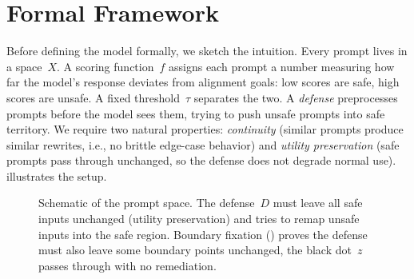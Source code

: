 \documentclass[11pt]{article}
\begin{document}
\section{Formal Framework}
\label{sec:setup}

Before defining the model formally, we sketch the intuition. Every
prompt lives in a space~$X$. A scoring function~$f$ assigns each prompt
a number measuring how far the model's response deviates from alignment
goals: low scores are safe, high scores are unsafe. A fixed
threshold~$\tau$ separates the two. A \emph{defense} preprocesses
prompts before the model sees them, trying to push unsafe prompts into
safe territory. We require two natural properties: \emph{continuity}
(similar prompts produce similar rewrites, i.e., no brittle edge-case
behavior) and \emph{utility preservation} (safe prompts pass through
unchanged, so the defense does not degrade normal use).
 illustrates the setup.

\begin{figure}[t]
\centering
{}
\caption{Schematic of the prompt space. The defense~$D$ must leave all
safe inputs unchanged (utility preservation) and tries to remap unsafe
inputs into the safe region. Boundary fixation () proves
the defense must also leave some boundary points unchanged, the black
dot~$z$ passes through with no remediation.}
\label{fig:landscape}
\end{figure}
\end{document}
